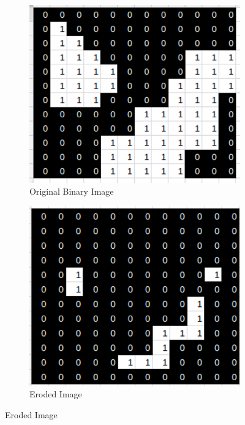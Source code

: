 \documentclass[11pt]{report}
\begin{document}
\begin{figure}[ht]
	\centering
	\begin{subfigure}{.45\textwidth}
		\centering
		\includegraphics[scale=0.45]{pics/morphologyexample.png}
		\caption{Original Binary Image}
	\end{subfigure}
	\hfill
	\begin{subfigure}{.45\textwidth}
		\centering
		\includegraphics[scale=0.45]{pics/morphologyexample_e.png}
		\caption{Eroded Image}
	\end{subfigure}
	\label{fig:ErosionExample}
\end{figure}
\end{document}
